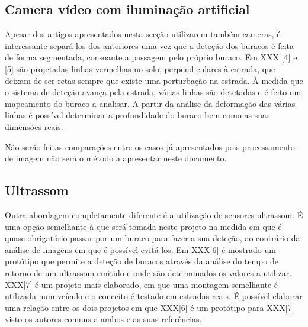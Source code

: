 \subsection{Camera vídeo com iluminação artificial}
\label{subsec: camera_video_com_iluminacao_artificial}
Apesar dos artigos apresentados nesta secção utilizarem também cameras, é interessante separá-los dos anteriores uma vez que a deteção dos buracos é feita de forma segmentada, consoante a passagem pelo próprio buraco. Em {XXX} [4] e [5] são projetadas linhas vermelhas no solo, perpendiculares à estrada, que deixam de ser retas sempre que existe uma perturbação na estrada. À medida que o sistema de deteção avança pela estrada, várias linhas são detetadas e é feito um mapeamento do buraco a analisar. A partir da análise da deformação das várias linhas é possível determinar a profundidade do buraco bem como as suas dimensões reais.

Não serão feitas comparações entre os casos já apresentados pois processamento de imagem não será o método a apresentar neste documento.

\subsection{Ultrassom}
\label{subsec: ultrassom}
Outra abordagem completamente diferente é a utilização de sensores ultrassom. É uma opção semelhante à que será tomada neste projeto na medida em que é quase obrigatório passar por um buraco para fazer a sua deteção, ao contrário da análise de imagens em que é possível evitá-los. Em {XXX}[6] é mostrado um protótipo que permite a deteção de buracos através da análise do tempo de retorno de um ultrassom emitido e onde são determinados os valores a utilizar. {XXX}[7] é um projeto mais elaborado, em que uma montagem semelhante é utilizada num veículo e o conceito é testado em estradas reais. É possível elaborar uma relação entre os dois projetos em que {XXX}[6] é um protótipo para {XXX}[7] visto os autores comuns a ambos e as suas referências.

